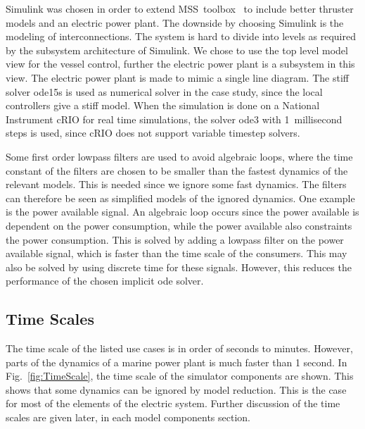 \documentclass[journal]{IEEEtran}
\begin{document}
Simulink was chosen in order to extend MSS~toolbox~\cite{MSS} to include better thruster models and an electric power plant.
The downside by choosing Simulink is the modeling of interconnections.
The system is hard to divide into levels as required by the subsystem architecture of Simulink.
We chose to use the top level model view for the vessel control, further the electric power plant is a subsystem in this view.
The electric power plant is made to mimic a single line diagram.
The stiff solver ode15s is used as numerical solver in the case study, since the local controllers give a stiff model.
When the simulation is done on a National Instrument cRIO for real time simulations, the solver ode3 with 1~millisecond steps is used, since cRIO does not support variable timestep solvers.

Some first order lowpass filters are used to avoid algebraic loops, where the time constant of the filters are chosen to be smaller than the fastest dynamics of the relevant models.
This is needed since we ignore some fast dynamics.
The filters can therefore be seen as simplified models of the ignored dynamics.
One example is the power available signal.
An algebraic loop occurs since the power available is dependent on the power consumption, while the power available also constraints the power consumption.
This is solved by adding a lowpass filter on the power available signal, which is faster than the time scale of the consumers.
This may also be solved by using discrete time for these signals.
However, this reduces the performance of the chosen implicit ode solver.

\subsection{Time Scales}
The time scale of the listed use cases is in order of seconds to minutes.
However, parts of the dynamics of a marine power plant is much faster than 1 second.
In Fig.~\ref{fig:TimeScale}, the time scale of the simulator components are shown.
This shows that some dynamics can be ignored by model reduction.
This is the case for most of the elements of the electric system. 
Further discussion of the time scales are given later, in each model components section.
\end{document}
